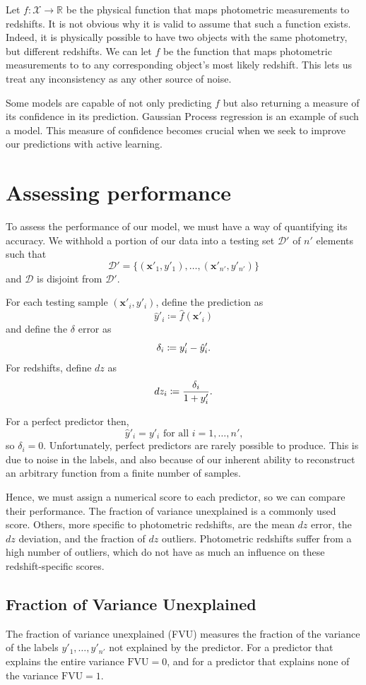 \documentclass[11pt,twoside]{report}
\newcommand\bbR{\mathbb{R}}
\newcommand\bx{\mathbf{x}}
\newcommand\cD{\mathcal{D}}
\newcommand\cX{\mathcal{X}}
\begin{document}
Let $f : \cX \to \bbR$ be the physical function that maps photometric measurements to redshifts. It is not obvious why it is valid to assume that such a function exists. Indeed, it is physically possible to have two objects with the same photometry, but different redshifts. We can let $f$ be the function that maps photometric measurements to to any corresponding object's most likely redshift. This lets us treat any inconsistency as any other source of noise.

Some models are capable of not only predicting $f$ but also returning a measure of its confidence in its prediction. Gaussian Process regression is an example of such a model. This measure of confidence becomes crucial when we seek to improve our predictions with active learning.

\section{Assessing performance}

To assess the performance of our model, we must have a way of quantifying its accuracy. We withhold a portion of our data into a testing set $\cD'$ of $n'$ elements such that \[
  \cD' = \{(\bx'_1, y'_1), \dots, (\bx'_{n'}, y'_{n'})\}
\] and $\cD$ is disjoint from $\cD'$.

For each testing sample $(\bx'_i, y'_i)$, define the prediction as\[
  \hat y'_i \coloneqq \hat f(\bx'_i)
\] and define the $\delta$ error as \[
  \delta_i \coloneqq y'_i - \hat y'_i\text.
\] For redshifts, define $dz$ as \[
  dz_i \coloneqq \frac{\delta_i}{1 + y'_i} \text.
\]

For a perfect predictor then,\[
  \hat y'_i = y'_i \text{ for all }i=1, \dots, n'\text{,}
\] so $\delta_i = 0$. Unfortunately, perfect predictors are rarely possible to produce. This is due to noise in the labels, and also because of our inherent ability to reconstruct an arbitrary function from a finite number of samples.

Hence, we must assign a numerical score to each predictor, so we can compare their performance. The fraction of variance unexplained is a commonly used score. Others, more specific to photometric redshifts, are the mean $dz$ error, the $dz$ deviation, and the fraction of $dz$ outliers. Photometric redshifts suffer from a high number of outliers, which do not have as much an influence on these redshift-specific scores.

\subsection{Fraction of Variance Unexplained}
The fraction of variance unexplained (FVU) measures the fraction of the variance of the labels $y'_1, \dots, y'_{n'}$ not explained by the predictor. For a predictor that explains the entire variance $\mathrm{FVU}=0$, and for a predictor that explains none of the variance $\mathrm{FVU}=1$.
\end{document}
